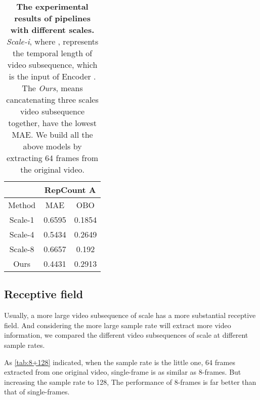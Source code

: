 \documentclass[10pt,twocolumn,letterpaper]{article}
\begin{document}
\begin{table}[ht]
\begin{center}

\begin{tabular}{c|cc}

\hline
        & \multicolumn{2}{c}{RepCount A}   \\ \hline
Method  & \multicolumn{1}{c|}{MAE}    & OBO     \\ \hline
Scale-1 & \multicolumn{1}{c|}{0.6595} & 0.1854 \\
Scale-4 & \multicolumn{1}{c|}{0.5434} & 0.2649 \\
Scale-8 & \multicolumn{1}{c|}{0.6657} & 0.192  \\
Ours    & \multicolumn{1}{c|}{0.4431} & 0.2913 \\ \hline
\end{tabular}
\caption{
\textbf{The experimental results of pipelines with different scales.} \textit{Scale-i}, where , represents the temporal length of video subsequence, which is the input of Encoder . The \textit{Ours}, means cancatenating three scales video subsequence together, have the lowest MAE. We build all the above models by extracting 64 frames from the original video.}
\label{tab:scales}
\end{center}
\end{table}


\subsection{Receptive field}
Usually, a more large video subsequence of scale has a more substantial receptive field. And considering the more large sample rate will extract more video information, we compared the different video subsequences of scale at different sample rates. 

As \cref{tab:8+128} indicated, when the sample rate is the little one, 64 frames extracted from one original video, single-frame is as similar as 8-frames. But increasing the sample rate to 128, The performance of 8-frames is far better than that of single-frames. 
\end{document}
